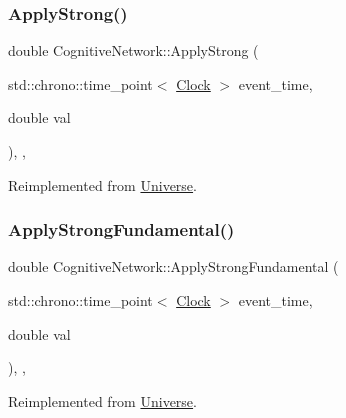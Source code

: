 \subsubsection{\texorpdfstring{Apply\+Strong()}{ApplyStrong()}}
{\footnotesize\ttfamily double Cognitive\+Network\+::\+Apply\+Strong (\begin{DoxyParamCaption}\item[{std\+::chrono\+::time\+\_\+point$<$ \mbox{\hyperlink{universe_8h_a0ef8d951d1ca5ab3cfaf7ab4c7a6fd80}{Clock}} $>$}]{event\+\_\+time,  }\item[{double}]{val }\end{DoxyParamCaption})\hspace{0.3cm}{\ttfamily [inline]}, {\ttfamily [final]}, {\ttfamily [virtual]}}



Reimplemented from \mbox{\hyperlink{classUniverse_a906a88b37f10bfa630bef49dfd0e907a}{Universe}}.

\mbox{\label{classCognitiveNetwork_af25bbd4f4d8f370cd2a48fd6db8302b9}} 
\subsubsection{\texorpdfstring{Apply\+Strong\+Fundamental()}{ApplyStrongFundamental()}}
{\footnotesize\ttfamily double Cognitive\+Network\+::\+Apply\+Strong\+Fundamental (\begin{DoxyParamCaption}\item[{std\+::chrono\+::time\+\_\+point$<$ \mbox{\hyperlink{universe_8h_a0ef8d951d1ca5ab3cfaf7ab4c7a6fd80}{Clock}} $>$}]{event\+\_\+time,  }\item[{double}]{val }\end{DoxyParamCaption})\hspace{0.3cm}{\ttfamily [inline]}, {\ttfamily [final]}, {\ttfamily [virtual]}}



Reimplemented from \mbox{\hyperlink{classUniverse_a62789bcff84bd750b0366004381e2fdd}{Universe}}.

\mbox{\label{classCognitiveNetwork_a8b60fdb81d89a3a74d6c06cb29e7aad3}} 
